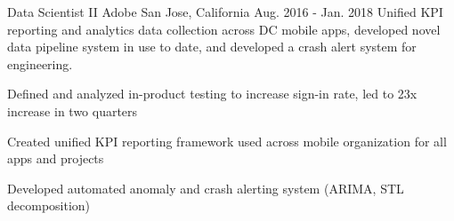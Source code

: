 \begin{cventries}
\cventry
    {Data Scientist II} %
    {Adobe} %
    {San Jose, California} %
    {Aug. 2016 - Jan. 2018} %
    {Unified KPI reporting and analytics data collection across DC mobile apps, developed novel data pipeline system in use to date, and developed a crash alert system for engineering.} %
    {
      \begin{cvitems} %
        \item {Defined and analyzed in-product testing to increase sign-in rate, led to 23x increase in two quarters}
        \item {Created unified KPI reporting framework used across mobile organization for all apps and projects}
        \item {Developed automated anomaly and crash alerting system (ARIMA, STL decomposition)}
      \end{cvitems}
    }

\end{cventries}
